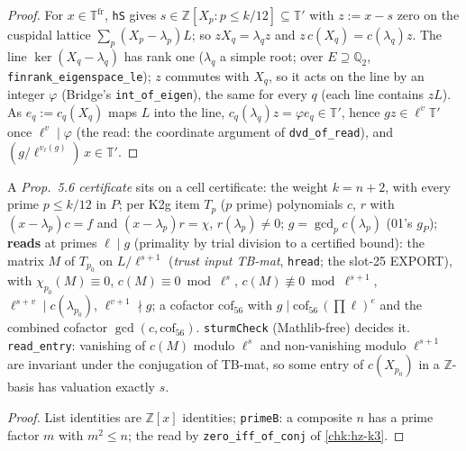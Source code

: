 \begin{proof}
  \leanok
  For $x\in\mathbb T^{\mathrm{fr}}$, \texttt{hS} gives $s\in\mathbb Z[X_p:p\le k/12]\subseteq\mathbb T'$ with $z:=x-s$ zero on the
  cuspidal lattice $\sum_p(X_p-\lambda_p)L$; so $zX_q=\lambda_qz$ and $z\,c(X_q)=c(\lambda_q)z$. The line $\ker(X_q-\lambda_q)$ has rank
  one ($\lambda_q$ a simple root; over $E\supseteq\mathbb Q_2$, \texttt{finrank\_eigenspace\_le}); $z$ commutes with $X_q$, so it acts on
  the line by an integer $\varphi$ (Bridge's \texttt{int\_of\_eigen}), the same for every $q$ (each line contains $zL$). As
  $e_q:=c_q(X_q)$ maps $L$ into the line, $c_q(\lambda_q)z=\varphi e_q\in\mathbb T'$, hence $g z\in\ell^v\mathbb T'$ once
  $\ell^v\mid\varphi$ (the read: the coordinate argument of \texttt{dvd\_of\_read}), and $(g/\ell^{v_\ell(g)})\,x\in\mathbb T'$.
\end{proof}

\begin{definition}\label{chk:hz-sturm}
  \leanok
  A \emph{Prop.~5.6 certificate} sits on a cell certificate: the weight $k=n+2$, with every prime $p\le k/12$ in $P$; per K2g item $T_p$
  ($p$ prime) polynomials $c$, $r$ with $(x-\lambda_p)c=f$ and $(x-\lambda_p)r=\chi$, $r(\lambda_p)\ne0$; $g=\gcd_pc(\lambda_p)$
  (01's $g_P$); \textbf{reads} at primes $\ell\mid g$ (primality by trial division to a certified bound): the matrix $M$ of $T_{p_0}$ on
  $L/\ell^{s+1}$ (\emph{trust input TB-mat}, \texttt{hread}; the slot-25 EXPORT), with $\chi_{p_0}(M)\equiv0$, $c(M)\equiv0\bmod\ell^s$,
  $c(M)\not\equiv0\bmod\ell^{s+1}$, $\ell^{s+v}\mid c(\lambda_{p_0})$, $\ell^{v+1}\nmid g$; a cofactor $\mathrm{cof}_{56}$ with
  $g\mid\mathrm{cof}_{56}\,(\prod\ell)^{e}$ and the combined cofactor $\gcd(c,\mathrm{cof}_{56})$. \texttt{sturmCheck} (Mathlib-free) decides
  it. \texttt{read\_entry}: vanishing of $c(M)$ modulo $\ell^s$ and non-vanishing modulo $\ell^{s+1}$ are invariant under the conjugation of
  TB-mat, so some entry of $c(X_{p_0})$ in a $\mathbb Z$-basis has valuation exactly $s$.
\end{definition}
\begin{proof}
  \leanok
  List identities are $\mathbb Z[x]$ identities; \texttt{primeB}: a composite $n$ has a prime factor $m$ with $m^2\le n$; the read by
  \texttt{zero\_iff\_of\_conj} of \ref{chk:hz-k3}.
\end{proof}

